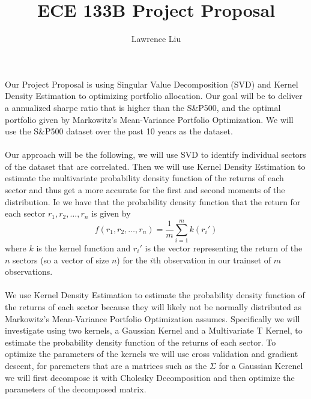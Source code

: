 \documentclass[10pt]{article}
\author{Lawrence Liu}
\title{ECE 133B Project Proposal}
\begin{document}
\maketitle
Our Project Proposal is using Singular Value Decomposition (SVD) and Kernel 
Density Estimation to optimizing portfolio allocation. Our goal will be to deliver a 
annualized sharpe ratio that is higher than the S\&P500, and the optimal portfolio given by 
Markowitz's Mean-Variance Portfolio Optimization. We will use the S\&P500 dataset
over the past 10 years as the dataset.\\\\
Our approach will be the following, we will use SVD to identify individual sectors of the 
dataset that are correlated. Then we will use Kernel Density Estimation to estimate the 
multivariate probability density function of the returns of each sector and thus get a more accurate for the first and second moments of the 
distribution. Ie  we have that the probability density function 
that the return for each sector $r_1, r_2, \dots, r_n$ is given by
$$
f(r_1, r_2, \dots, r_n) = \frac{1}{m}\sum_{i=1}^m k(r_i')
$$
where $k$ is the kernel function and $r_i'$ is the vector representing the 
return of the $n$ sectors (so a vector of size $n$) for the $i$th observation 
in our trainset of $m$ observations.\\\\
We use Kernel Density Estimation to 
estimate the probability density function of the returns of each sector because they will likely not be 
normally distributed as Markowitz's Mean-Variance Portfolio Optimization assumes. Specifically we will investigate using 
two kernels, a Gaussian Kernel and a Multivariate T Kernel, to estimate the probability density function of the returns of each sector. To optimize
the parameters of the kernels we will use cross validation and gradient descent, for paremeters that are a matrices such as the 
$\Sigma$ for a Gaussian Kerenel we will first decompose it with Cholesky Decomposition and then optimize the parameters of the
decomposed matrix.
\end{document}
